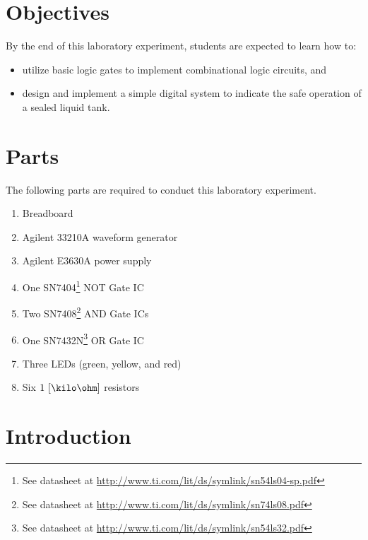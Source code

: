 
\section{Objectives}
By the end of this laboratory experiment, students are expected to learn how to:

\begin{itemize}

\item utilize basic logic gates to implement combinational logic circuits, and 
  
\item design and implement a simple digital system to indicate the safe operation of a sealed liquid tank.
   
\end{itemize}

\section{Parts}
\label{sec:partsEx13}
The following parts are required to conduct this laboratory experiment. %
%
\begin{enumerate}           
\item Breadboard
\item Agilent 33210A waveform generator
\item Agilent E3630A power supply
\item One SN7404\footnote{See datasheet at \url{http://www.ti.com/lit/ds/symlink/sn54ls04-sp.pdf}} NOT Gate IC
\item Two SN7408\footnote{See datasheet at \url{http://www.ti.com/lit/ds/symlink/sn74ls08.pdf}}   AND Gate ICs
\item One SN7432N\footnote{See datasheet at \url{http://www.ti.com/lit/ds/symlink/sn54ls32.pdf}}  OR Gate IC
\item Three LEDs (green, yellow, and red) 
  
\item Six $1~[\kilo\ohm]$ resistors 
\end{enumerate}


\section{Introduction}
\label{sec:introduction}

